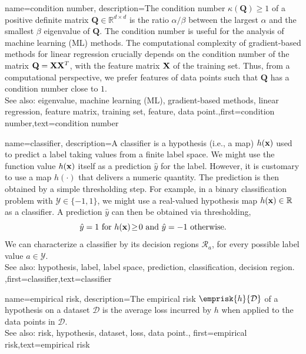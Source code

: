 {
	name={condition number},
	description={The condition number $\kappa(\mathbf{Q}) \geq 1$ of a 
		positive definite 
		matrix $\mathbf{Q} \in \mathbb{R}^{d \times d}$ is the ratio 
		$\alpha /\beta  $ between the 
		largest $\alpha$ and the smallest $\beta$ eigenvalue of 
		$\mathbf{Q}$. The condition number is useful for the analysis of machine learning (ML) methods. 
		The computational complexity of gradient-based methods for linear regression crucially depends on the 
		condition number of the matrix $\mathbf{Q} = {\bf X} {\bf X}^{T}$, with the feature matrix ${\bf X}$ 
		of the training set. Thus, from a computational perspective, we prefer features of 
		data points such that $\mathbf{Q}$ has a condition number close to $1$.
					\\ 
		See also: eigenvalue, machine learning (ML), gradient-based methods, linear regression, feature matrix, training set, feature, data point.},first={condition number},text={condition number} 
}

{
	name={classifier},
	description={A classifier is a hypothesis (i.e., a map) $h({\bf x})$ 
		used to predict a label taking values from a finite label space. We might use the 
		function value $h({\bf x})$ itself as a prediction $\hat{y}$ for 
		the label. However, it is customary to use a map $h(\cdot)$ that delivers 
		a numeric quantity. The prediction is then obtained by a simple thresholding step. 
		For example, in a binary classification problem with \label{labelspace} $\mathcal{Y} \in  \{ -1,1\}$, 
		we might use a real-valued hypothesis map $h({\bf x}) \in \mathbb{R}$ 
		as a classifier. A prediction $\hat{y}$ can then be obtained via thresholding,  
		 \begin{equation} 
		 	\label{equ_def_threshold_bin_classifier_dict}
		 	\hat{y} =1   \mbox{ for } h({\bf x})\!\geq\!0 \mbox{ and } 	\hat{y} =-1  \mbox{ otherwise.}
	 		\end{equation}
 		We can characterize a classifier by its decision regions $\mathcal{R}_{a}$, for 
 		every possible label value $a \in \mathcal{Y}$.
					\\ 
		See also: hypothesis, label, label space, prediction, classification, decision region. },first={classifier},text={classifier} 
}

{name={empirical risk},
  description={The empirical risk $\emprisk{h}{\mathcal{D}}$ 
  	of a hypothesis on a dataset $\mathcal{D}$ is the average loss incurred 
  	by $h$ when applied to the data points in $\mathcal{D}$.
				\\ 
		See also: risk, hypothesis, dataset, loss, data point.},
  first={empirical risk},text={empirical risk} 
}

